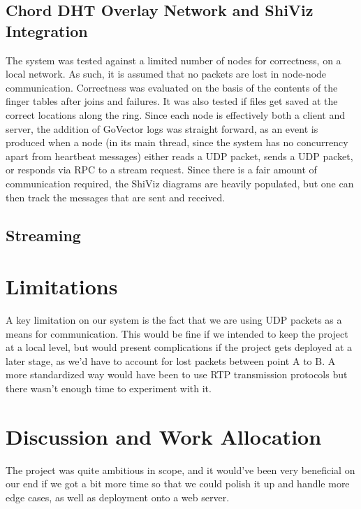 \documentclass[fleqn,24pt]{SelfArx} %
\begin{document}
\subsection{Chord DHT Overlay Network and ShiViz Integration}

The system was tested against a limited number of nodes for correctness, on a local network. As such, it is assumed that no packets are lost in node-node communication. Correctness was evaluated on the basis of the contents of the finger tables after joins and failures. It was also tested if files get saved at the correct locations along the ring. Since each node is effectively both a client and server, the addition of GoVector logs was straight forward, as an event is produced when a node (in its main thread, since the system has no concurrency apart from heartbeat messages) either reads a UDP packet, sends a UDP packet, or responds via RPC to a stream request. Since there is a fair amount of communication required, the ShiViz diagrams are heavily populated, but one can then track the messages that are sent and received.

\subsection{Streaming}



\section{Limitations}

A key limitation on our system is the fact that we are using UDP packets as a means for communication. This would be fine if we intended to keep the project at a local level, but would present complications if the project gets deployed at a later stage, as we'd have to account for lost packets between point A to B. A more standardized way would have been to use RTP transmission protocols but there wasn't enough time to experiment with it. 

\section{Discussion and Work Allocation}

The project was quite ambitious in scope, and it would've been very beneficial on our end if we got a bit more time so that we could polish it up and handle more edge cases, as well as deployment onto a web server. 
\end{document}
